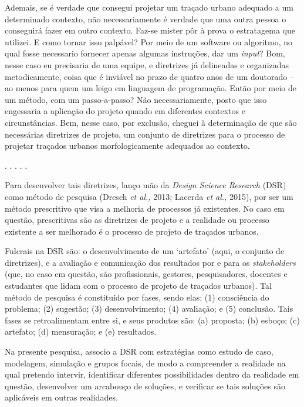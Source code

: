 \documentclass[]{report}
\begin{document}
	Ademais, se é verdade que consegui projetar um traçado urbano adequado a um determinado contexto, não necessariamente é verdade que uma outra pessoa o conseguirá fazer em outro contexto. Faz-se mister pôr à prova o estratagema que utilizei. E como tornar isso palpável? Por meio de um software ou algoritmo, no qual fosse necessario fornecer apenas algumas instruções, dar um \textit{input}? Bom, nesse caso eu precisaria de uma equipe, e diretrizes já delineadas e organizadas metodicamente, coisa que é inviável no prazo de quatro anos de um doutorado – ao menos para quem um leigo em linguagem de programação. Então por meio de um método, com um passo-a-passo? Não necessariamente, posto que isso engessaria a aplicação do projeto quando em diferentes contextos e circunstâncias. Bem, nesse caso, por exclusão, cheguei à determinação de que são necessárias diretrizes de projeto, um conjunto de diretrizes para o processo de projetar traçados urbanos morfologicamente adequados ao contexto.

	\begin{center}
		. . . . .
	\end{center}

	Para desenvolver tais diretrizes, lanço mão da \textit{Design Science Research} (DSR) como método de pesquisa (Dresch \textit{et al.,} 2013; Lacerda \textit{et al.,} 2015), por ser um método prescritivo que visa a melhoria de processos já existentes. No caso em questão, prescritivas são as diretrizes de projeto e a realidade ou processo existente a ser melhorado é o processo de projeto de traçados urbanos. 
	
	Fulcrais na DSR são: o desenvolvimento de um `artefato' (aqui, o conjunto de diretrizes), e a avaliação e comunicação dos resultados por e para os \textit{stakeholders} (que, no caso em questão, são profissionais, gestores, pesquisadores, docentes e estudantes que lidam com o processo de projeto de traçados urbanos). Tal método de pesquisa é constituído por fases, sendo elas: (1) consciência do problema; (2) sugestão; (3) desenvolvimento; (4) avaliação; e (5) conclusão. Tais fases se retroalimentam entre si, e seus produtos são: (a) proposta; (b) esboço; (c) artefato; (d) mensuração; e (e) resultados.
	
	Na presente pesquisa, associo a DSR com estratégias como estudo de caso, modelagem, simulação e grupos focais, de modo a compreender a realidade na qual pretendo intervir, identificar diferentes possibilidades dentro da realidade em questão, desenvolver um arcabouço de soluções, e verificar se tais soluções são aplicáveis em outras realidades.
\end{document}
